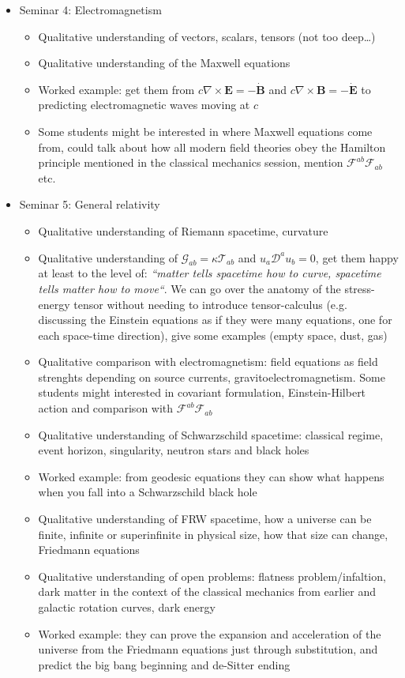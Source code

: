 \documentclass{article}
\begin{document}
\begin{itemize}
\begin{itemize}
    \end{itemize}
  \item Seminar 4: Electromagnetism
    \begin{itemize}
      \item Qualitative understanding of vectors, scalars, tensors (not too deep\ldots)
      \item Qualitative understanding of the Maxwell equations
      \item Worked example: get them from $c\nabla\times\mathbf{E}=-\dot{\mathbf{B}}$ and $c\nabla\times\mathbf{B}=-\dot{\mathbf{E}}$ to predicting electromagnetic waves moving at $c$
      \item Some students might be interested in where Maxwell equations come from, could talk about how all modern field theories obey the Hamilton principle mentioned in the classical mechanics session, mention $\mathcal{  F}^{ab}\mathcal{  F}_{ab}$ etc.
    \end{itemize}
  \item Seminar 5: General relativity
    \begin{itemize}
      \item Qualitative understanding of Riemann spacetime, curvature
      \item Qualitative understanding of $\mathcal{  G}_{ab}=\kappa \mathcal{  T}_{ab}$ and $u_a \mathcal{  D}^a u_b=0$, get them happy at least to the level of: \textit{“matter tells spacetime how to curve, spacetime tells matter how to move“}. We can go over the anatomy of the stress-energy tensor without needing to introduce tensor-calculus (e.g. discussing the Einstein equations as if they were many equations, one for each space-time direction), give some examples (empty space, dust, gas)
      \item Qualitative comparison with electromagnetism: field equations as field strenghts depending on source currents, gravitoelectromagnetism. Some students might interested in covariant formulation, Einstein-Hilbert action and comparison with $\mathcal{  F}^{ab}\mathcal{  F}_{ab}$
      \item Qualitative understanding of Schwarzschild spacetime: classical regime, event horizon, singularity, neutron stars and black holes
      \item Worked example: from geodesic equations they can show what happens when you fall into a Schwarzschild black hole
      \item Qualitative understanding of FRW spacetime, how a universe can be finite, infinite or superinfinite in physical size, how that size can change, Friedmann equations
      \item Qualitative understanding of open problems: flatness problem/infaltion, dark matter in the context of the classical mechanics from earlier and galactic rotation curves, dark energy
      \item Worked example: they can prove the expansion and acceleration of the universe from the Friedmann equations just through substitution, and predict the big bang beginning and de-Sitter ending
    \end{itemize}
\end{itemize}
\end{document}
